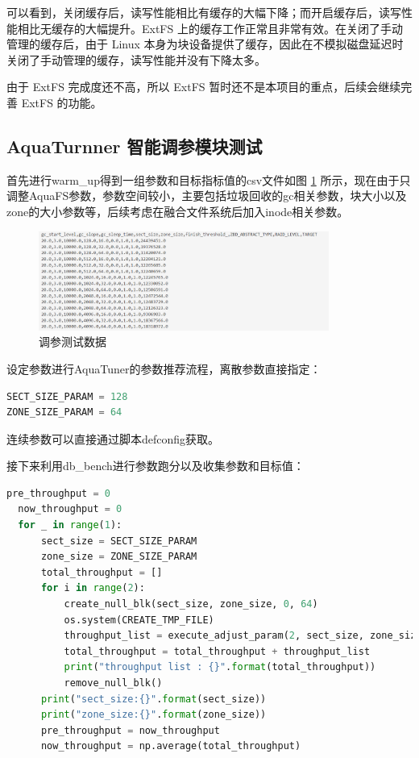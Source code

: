 可以看到，关闭缓存后，读写性能相比有缓存的大幅下降；而开启缓存后，读写性能相比无缓存的大幅提升。ExtFS 上的缓存工作正常且非常有效。在关闭了手动管理的缓存后，由于 Linux 本身为块设备提供了缓存，因此在不模拟磁盘延迟时关闭了手动管理的缓存，读写性能并没有下降太多。

由于 ExtFS 完成度还不高，所以 ExtFS 暂时还不是本项目的重点，后续会继续完善 ExtFS 的功能。

\subsection{AquaTurnner 智能调参模块测试}

首先进行warm\_up得到一组参数和目标指标值的csv文件如图 \ref{test-turnner1} 所示，现在由于只调整AquaFS参数，参数空间较小，主要包括垃圾回收的gc相关参数，块大小以及zone的大小参数等，后续考虑在融合文件系统后加入inode相关参数。

\begin{figure}[htbp]
  \centering
  \includegraphics[width=0.85\textwidth]{fig/turnner1}
  \caption{ 调参测试数据 }
  \label{test-turnner1}
\end{figure}

设定参数进行AquaTuner的参数推荐流程，离散参数直接指定：

\begin{lstlisting}[language=Python]
SECT_SIZE_PARAM = 128
ZONE_SIZE_PARAM = 64
\end{lstlisting}

连续参数可以直接通过脚本defconfig获取。

接下来利用db\_bench进行参数跑分以及收集参数和目标值：

\begin{lstlisting}[language=Python]
  pre_throughput = 0
  now_throughput = 0
  for _ in range(1):
      sect_size = SECT_SIZE_PARAM
      zone_size = ZONE_SIZE_PARAM
      total_throughput = []
      for i in range(2):
          create_null_blk(sect_size, zone_size, 0, 64)
          os.system(CREATE_TMP_FILE)
          throughput_list = execute_adjust_param(2, sect_size, zone_size)
          total_throughput = total_throughput + throughput_list
          print("throughput list : {}".format(total_throughput))
          remove_null_blk()
      print("sect_size:{}".format(sect_size))
      print("zone_size:{}".format(zone_size))
      pre_throughput = now_throughput
      now_throughput = np.average(total_throughput)
\end{lstlisting}

